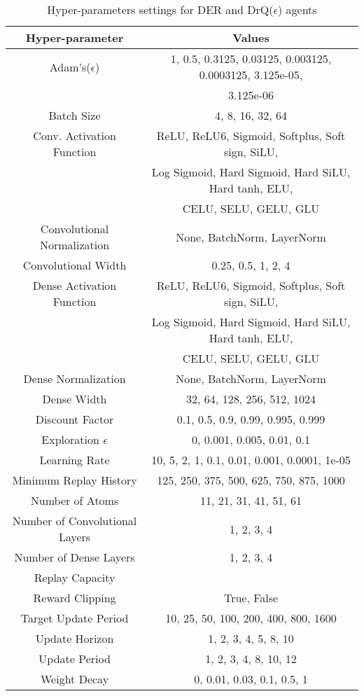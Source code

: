 \documentclass[10pt]{article} %
\begin{document}
\begin{table*}[!ht]
 \centering
  \caption{Hyper-parameters settings for DER and DrQ($\epsilon$) agents}
  \label{tbl:allvalues}
 \begin{tabular}{@{} cc @{}}
    \toprule
  Hyper-parameter &  Values \\
  \midrule
  Adam's($\epsilon$) & 1, 0.5, 0.3125, 0.03125, 0.003125, 0.0003125, 3.125e-05,\\
  & 3.125e-06 \\
  Batch Size & 4, 8, 16, 32, 64 \\
  Conv. Activation Function &  ReLU, ReLU6, Sigmoid, Softplus, Soft sign, SiLU, \\
  & Log Sigmoid, Hard Sigmoid, Hard SiLU, Hard tanh, ELU, \\
  & CELU, SELU, GELU, GLU \\
  Convolutional Normalization &  None, BatchNorm, LayerNorm \\
  Convolutional Width & 0.25, 0.5, 1, 2, 4 \\
  Dense Activation Function &  ReLU, ReLU6, Sigmoid, Softplus, Soft sign, SiLU, \\
  & Log Sigmoid, Hard Sigmoid, Hard SiLU, Hard tanh, ELU, \\
  & CELU, SELU, GELU, GLU \\
  Dense Normalization &  None, BatchNorm, LayerNorm \\
  Dense Width &  32, 64, 128, 256, 512, 1024 \\
  Discount Factor &  0.1, 0.5, 0.9, 0.99, 0.995, 0.999\\
  Exploration $\epsilon$ &  0, 0.001, 0.005, 0.01, 0.1\\
  Learning Rate & 10, 5, 2, 1, 0.1, 0.01, 0.001, 0.0001, 1e-05 \\
  Minimum Replay History & 125, 250, 375, 500, 625, 750, 875, 1000 \\
  Number of Atoms & 11, 21, 31, 41, 51, 61\\
  Number of Convolutional Layers &  1, 2, 3, 4\\
  Number of Dense Layers &  1, 2, 3, 4 \\
  Replay Capacity &  \\
  Reward Clipping &  True, False\\
  Target Update Period &  10, 25, 50, 100, 200, 400, 800, 1600\\
  Update Horizon & 1, 2, 3, 4, 5, 8, 10\\
  Update Period &  1, 2, 3, 4, 8, 10, 12\\
  Weight Decay &  0, 0.01, 0.03, 0.1, 0.5, 1\\

  \midrule
  \end{tabular}
\end{table*}
\end{document}
